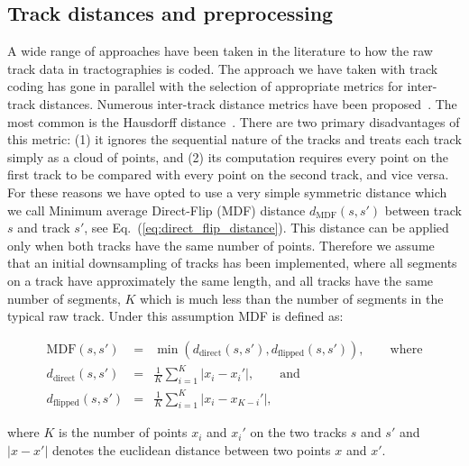 \documentclass[preprint,authoryear,a4paper,10pt,onecolumn]{elsarticle}
\begin{document}
\subsection{\label{sub:track-distances}Track distances and preprocessing}

A wide range of approaches have been taken in the literature to how the
raw track data in tractographies is coded. The approach we have taken
with track coding has gone in parallel with the selection of appropriate
metrics for inter-track distances.  Numerous inter-track distance
metrics have been proposed~\citep{Ding2003, MaddahIPMI2007,
  zhang2005dti}. The most common is the Hausdorff distance~\citep[and
many other studies]{corouge2004towards}. There are two primary
disadvantages of this metric: (1) it ignores the sequential nature of
the tracks and treats each track simply as a cloud of points, and (2)
its computation requires every point on the first track to be compared
with every point on the second track, and vice versa. For these reasons
we have opted to use a very simple symmetric distance \citep{EGMB10,
  Visser2010} which we call Minimum average Direct-Flip (MDF) distance
$d_{\textrm{MDF}}(s,s')$ between track $s$ and track $s'$, see
Eq.~(\ref{eq:direct_flip_distance}). This distance can be applied only
when both tracks have the same number of points. Therefore we assume
that an initial downsampling of tracks has been implemented, where all
segments on a track have approximately the same length, and all tracks
have the same number of segments, $K$ which is much less than the number
of segments in the typical raw track. Under this assumption MDF is
defined as:

\begin{eqnarray}
\textrm{MDF}(s,s') & = & \min(d_{\textrm{direct}}(s,s'),d_{\textrm{flipped}}(s,s')),\qquad\textrm{where}\nonumber\\
d_{\textrm{direct}}(s,s') & = & \frac{1}{K}\sum_{i=1}^{K}|x_{i}-x_{i}'|,\qquad\textrm{and}\label{eq:direct_flip_distance} \\
d_{\textrm{flipped}}(s,s') & = & \frac{1}{K}\sum_{i=1}^{K}|x_{i}-x_{K-i}'|,\nonumber
\end{eqnarray}

\noindent
where $K$ is the number of points $x_{i}$ and $x_{i}'$ on the two tracks $s$ and $s'$
and $|x-x'|$ denotes the euclidean distance between two points $x$ and
$x'$.
\end{document}
